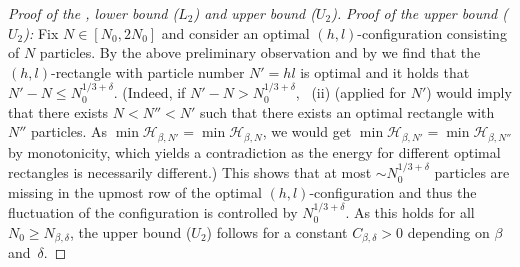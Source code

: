 \documentclass[reqno]{amsart}
\theoremstyle{plain}
\theoremstyle{definition}
\numberwithin{equation}{section}
\begin{document}
\begin{proof}[Proof of the ,   lower bound
  {\rm ($L_2$)} and upper bound   {\rm ($U_2$)}]
\emph{Proof of  the upper bound  {\rm ($U_2$)}:} Fix $N \in
[N_0,2N_0]$ and consider an optimal $(h,l)$-configuration consisting
of $N$  particles.    By the  above  preliminary observation and 
by      we find that the $(h,l)$-rectangle
with  particle  number $N' = hl$  is optimal and it holds that    $N' - N
\le N_0^{1/3+\delta}  $. (Indeed,  if  $N' - N >
N_0^{1/3+\delta}$, ~(ii)  (applied for
$N'$)    would imply that there exists $N < N'' <N'$ such that
there exists an optimal rectangle with $N''$  particles.   As $\min
\mathcal{H}_{\beta,N'} = \min \mathcal{H}_{\beta,N}$, we would get $
\min \mathcal{H}_{\beta,N'}  = \min \mathcal{H}_{\beta,N''}$ by
monotonicity, which yields a contradiction as the energy for different
optimal rectangles is necessarily different.)  This shows that at most
$\sim N_0^{1/3+\delta}$  particles  are missing in the upmost row of the optimal $(h,l)$-configuration and thus  the fluctuation of the configuration is
controlled by $N_0^{1/3+\delta}$. As this holds for all $N_0 \ge N_{\beta,\delta}  $,  the upper bound  {\rm ($U_2$)} follows for a constant $C_{\beta,\delta}>0$ depending on $\beta$ and~$\delta$.
\end{proof}
\end{document}
